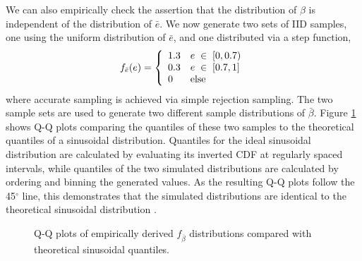 We can also empirically check the assertion that the distribution of $\beta$ is independent of the distribution of $\bar e$.  We now generate two sets of IID samples, one using the uniform distribution of $\bar e$, and one distributed via a step function,
\begin{equation}\label{eq:piecewise_fe}
f_{\bar e}(e) = \left\{
    \begin{array}{l l}
   1.3 & e \; \in \; [0, 0.7) \\
   0.3 & e \; \in \; [0.7, 1]\\
    0 & \mathrm{else}
    \end{array}
    \right.
\end{equation}
where accurate sampling is achieved via simple rejection sampling.  The two sample sets are used to generate two different sample distributions of $\bar\beta$.  Figure \ref{fig:qqplots} shows Q-Q plots comparing the quantiles of these two samples to the theoretical quantiles of a sinusoidal distribution.  Quantiles for the ideal sinusoidal distribution are calculated by evaluating its inverted CDF at regularly spaced intervals, while quantiles of the two simulated distributions are calculated by ordering and binning the generated values.  As the resulting Q-Q plots follow the 45$^\circ$ line, this demonstrates that the simulated distributions are identical to the theoretical sinusoidal distribution \citep{gibbons2003nonparametric}.
 \begin{figure}[ht]
\centering
{}
 \caption[$f_{\bar\beta}$ Q-Q plots]{ Q-Q plots of empirically derived $f_{\bar\beta}$ distributions compared with theoretical sinusoidal quantiles. \label{fig:qqplots}}
\end{figure}

